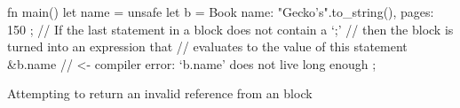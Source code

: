 \begin{listing}[H]
\begin{rustcode}
fn main() {
  let name = unsafe {
    let b = Book { name: "Gecko's".to_string(), pages: 150 };
    // If the last statement in a block does not contain a `;'
    // then the block is turned into an expression that
    // evaluates to the value of this statement
    &b.name // <- compiler error: `b.name' does not live long enough
  };
}
\end{rustcode}
\caption{Attempting to return an invalid reference from an  block}
\label{lst:unsafe_reference}
\end{listing}
